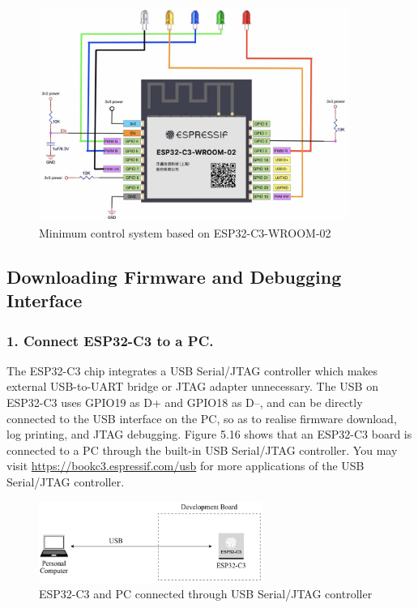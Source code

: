 \documentclass[a4paper,12pt,openany]{book}
\begin{document}
\begin{figure}[h!]
    \centering
    \includegraphics[width=0.9\textwidth]{D5Z/5-15}
    \caption{Minimum control system based on ESP32-C3-WROOM-02}
\end{figure}

\subsection{Downloading Firmware and Debugging Interface}
\subsubsection{1. Connect ESP32-C3 to a PC.}
The ESP32-C3 chip integrates a USB Serial/JTAG controller which makes external USB-to-UART bridge or JTAG adapter unnecessary. The USB on ESP32-C3 uses GPIO19 as D+ and GPIO18 as D--, and can be directly connected to the USB interface on the PC, so as to realise firmware download, log printing, and JTAG debugging. Figure 5.16 shows that an ESP32-C3 board is connected to a PC through the built-in USB Serial/JTAG controller. You may visit \url{https://bookc3.espressif.com/usb} for more applications of the USB Serial/JTAG controller.

\begin{figure}[h!]
    \centering
    \includegraphics[width=0.65\textwidth]{D5Z/5-16}
    \caption{ESP32-C3 and PC connected through USB Serial/JTAG controller}
\end{figure}
\end{document}
